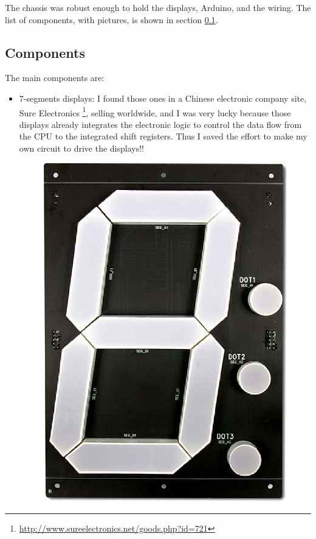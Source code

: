 \documentclass[11pt,english]{article}
\begin{document}
The chassis was robust enough to hold the displays, Arduino, and the wiring.
The list of components, with pictures, is shown in section \ref{subsec:components}.


\subsection{Components}\label{subsec:components}

The main components are:

\begin{itemize}
 \item 7-segments displays: I found those ones in a Chinese electronic company site, 
 Sure Electronics \footnote{\url{http://www.sureelectronics.net/goods.php?id=721}}, 
 selling worldwide, and I was very lucky because those displays already integrates the 
 electronic logic to  control the data flow from the CPU to the integrated shift registers. 
 Thus I saved the  effort to make my own circuit to drive the displays!!
 
  \begin{figure}[H]
  \centering\includegraphics[scale=0.25]{img/7-inch-dis}


\end{figure}
\end{itemize}
\end{document}
